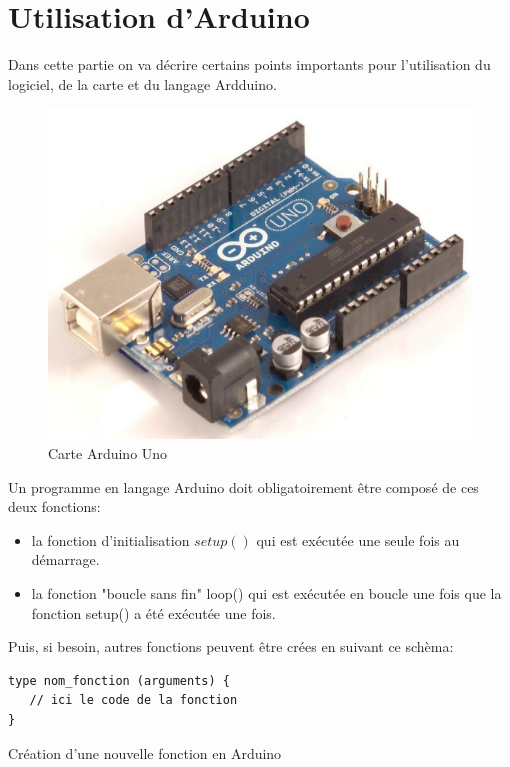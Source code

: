 \section{Utilisation d'Arduino}

  Dans cette partie on va décrire certains points importants pour l'utilisation du logiciel, de la carte et du langage Ardduino.

\begin{figure}[h]
\begin{center}
 \includegraphics[scale=0.4]{../images/Arduino/arduinoUno.png}
\caption{Carte Arduino Uno}
\end{center}
\end{figure}

Un programme en langage Arduino doit obligatoirement être composé de ces deux fonctions:
\begin{itemize}
 \item la fonction d'initialisation $setup()$ qui est exécutée une seule fois au démarrage.
 \item la fonction "boucle sans fin" loop() qui est exécutée en boucle une fois que la fonction setup() a été exécutée une fois.
\end{itemize}

Puis, si besoin, autres fonctions peuvent être crées en suivant ce schèma:
\begin{table}[h]
\begin{lstlisting}
type nom_fonction (arguments) {
   // ici le code de la fonction
}
\end{lstlisting}
\caption{Création d'une nouvelle fonction en Arduino}
\end{table}


